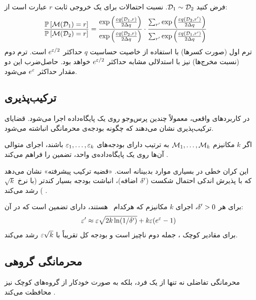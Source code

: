 \begin{اثبات}
فرض کنید $\Dset[1] \sim \Dset[2]$. نسبت احتمالات برای یک خروجی ثابت $r$ عبارت است از:
\begin{align*}
\frac{\mathbb{P}\left[\mech(\Dset[1]) = r\right]}{\mathbb{P}\left[\mech(\Dset[2]) = r\right]} &= \frac{\exp\left(\frac{\eps q(\Dset[1], r)}{2\Del q}\right)}{\exp\left(\frac{\eps q(\Dset[2], r)}{2\Del q}\right)} \cdot \frac{\sum_{r'} \exp\left(\frac{\eps q(\Dset[2], r')}{2\Del q}\right)}{\sum_{r'} \exp\left(\frac{\eps q(\Dset[1], r')}{2\Del q}\right)}
\end{align*}
ترم اول (صورت کسرها) با استفاده از خاصیت حساسیت $q$ حداکثر $e^{\varepsilon/2}$ است. ترم دوم (نسبت مخرج‌ها) نیز با استدلالی مشابه حداکثر $e^{\varepsilon/2}$ خواهد بود. حاصل‌ضرب این دو مقدار حداکثر $e^{\varepsilon}$ می‌شود.
\end{اثبات}

\subsection{ترکیب‌پذیری}
در کاربردهای واقعی، معمولاً چندین پرس‌وجو روی یک پایگاه‌داده اجرا می‌شود. قضایای ترکیب‌پذیری نشان می‌دهند که چگونه بودجه‌ی محرمانگی انباشته می‌شود.

\begin{قضیه}
\label{thm:basic-comp}
اگر $k$ مکانیزم $\mech_1, \dots, \mech_k$ به ترتیب دارای بودجه‌های $\varepsilon_1, \dots, \varepsilon_k$ باشند، اجرای متوالی آن‌ها روی یک پایگاه‌داده‌ی واحد، تضمین  را فراهم می‌کند \cite{dwork2014roth}.
\end{قضیه}

این کران خطی در بسیاری موارد بدبینانه است. «قضیه ترکیب پیشرفته» نشان می‌دهد که با پذیرش اندکی احتمال شکست ($\delta'$ اضافه)، انباشت بودجه بسیار کندتر (با نرخ $\sqrt{k}$) رشد می‌کند \cite{dwork2014roth}.

\begin{قضیه}
\label{thm:advanced-comp}
برای هر $\delta' > 0$، اجرای $k$ مکانیزم که هرکدام \DP\ هستند، دارای تضمین  است که در آن:
\begin{equation}
\varepsilon' \approx \varepsilon \sqrt{2k \ln(1/\delta')} + k\varepsilon(e^{\varepsilon} - 1)
\end{equation}
برای مقادیر کوچک \eps، جمله دوم ناچیز است و بودجه کل تقریباً با $\varepsilon\sqrt{k}$ رشد می‌کند.
\end{قضیه}

\subsection{محرمانگی گروهی}
محرمانگی تفاضلی نه تنها از یک فرد، بلکه به صورت خودکار از گروه‌های کوچک نیز محافظت می‌کند \cite{dwork2014roth}.

